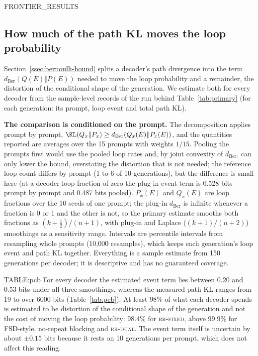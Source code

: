 {{FRONTIER_RESULTS}}

\subsection{How much of the path KL moves the loop probability}\label{ssec:eventlevel}
Section~\ref{ssec:bernoulli-bound} splits a decoder's path divergence into the term $d_{\mathrm{Ber}}(Q(E)\Vert P(E))$ needed to move the loop probability and a remainder, the distortion of the conditional shape of the generation. We estimate both for every decoder from the sample-level records of the run behind Table~\ref{tab:primary} (for each generation: its prompt, loop event and total path KL).

\textbf{The comparison is conditioned on the prompt.} The decomposition applies prompt by prompt, $\KL(Q_x\Vert P_x)\ge d_{\mathrm{Ber}}(Q_x(E)\Vert P_x(E))$, and the quantities reported are averages over the 15 prompts with weights $1/15$. Pooling the prompts first would use the pooled loop rates and, by joint convexity of $d_{\mathrm{Ber}}$, can only lower the bound, overstating the distortion that is not needed; the reference loop count differs by prompt (1 to 6 of 10 generations), but the difference is small here (at a decoder loop fraction of zero the plug-in event term is 0.528 bits prompt by prompt and 0.487 bits pooled). $P_x(E)$ and $Q_x(E)$ are loop fractions over the 10 seeds of one prompt; the plug-in $d_{\mathrm{Ber}}$ is infinite whenever a fraction is 0 or 1 and the other is not, so the primary estimate smooths both fractions as $(k+\tfrac12)/(n+1)$, with plug-in and Laplace ($(k+1)/(n+2)$) smoothings as a sensitivity range. Intervals are percentile intervals from resampling whole prompts (10{,}000 resamples), which keeps each generation's loop event and path KL together. Everything is a sample estimate from 150 generations per decoder; it is descriptive and has no guaranteed coverage.

{{TABLE:pcb}}
For every decoder the estimated event term lies between 0.20 and 0.53 bits under all three smoothings, whereas the measured path KL ranges from 19 to over 6000 bits (Table~\ref{tab:pcb}). At least 98\% of what each decoder spends is estimated to be distortion of the conditional shape of the generation and not the cost of moving the loop probability: 98.4\% for \textsc{rr-fixed}, above 99.9\% for FSD-style, no-repeat blocking and \textsc{rr-dual}. The event term itself is uncertain by about $\pm0.15$ bits because it rests on 10 generations per prompt, which does not affect this reading.

